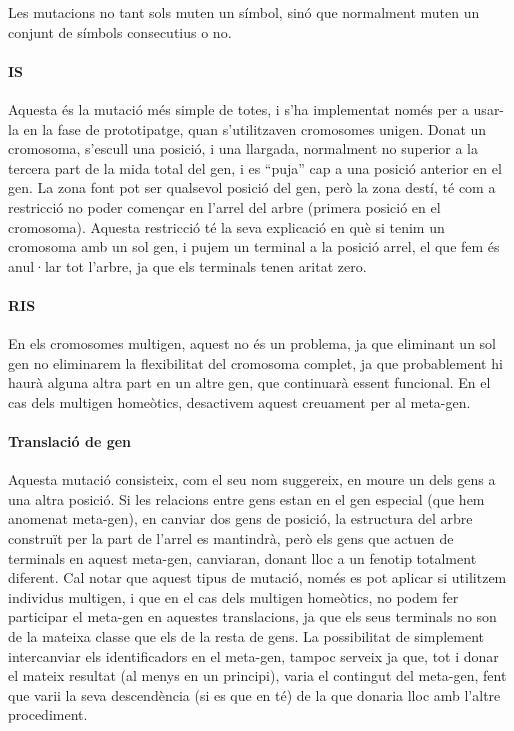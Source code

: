 Les mutacions no tant sols muten un símbol, sinó que normalment muten un
conjunt de símbols consecutius o no.

\paragraph{IS} %
\label{par:IS}
Aquesta és la mutació més simple de totes, i s'ha implementat només per a
usar-la en la fase de prototipatge, quan s'utilitzaven cromosomes unigen.  Donat
un cromosoma, s'escull una posició, i una llargada, normalment no superior a la
tercera part de la mida total del gen, i es ``puja'' cap a una posició anterior
en el gen.  La zona font pot ser qualsevol posició del gen, però la zona destí,
té com a restricció no poder començar en l'arrel del arbre (primera posició en
el cromosoma).  Aquesta restricció té la seva explicació en què si tenim un
cromosoma amb un sol gen, i pujem un terminal a la posició arrel, el que fem és
anul·lar tot l'arbre, ja que els terminals tenen aritat zero.


\paragraph{RIS} %
\label{par:RIS}
En els cromosomes multigen, aquest no és un problema, ja que eliminant un sol
gen no eliminarem la flexibilitat del cromosoma complet, ja que probablement hi
haurà alguna altra part en un altre gen, que continuarà essent funcional.  En el
cas dels multigen homeòtics, desactivem aquest creuament per al meta-gen.

\paragraph{Translació de gen} %
\label{par:Translacio de gen}

Aquesta mutació consisteix, com el seu nom suggereix, en moure un dels gens a una
altra posició.  Si les relacions entre gens estan en el gen especial (que hem
anomenat meta-gen), en canviar dos gens de posició, la estructura del arbre
construït per la part de l'arrel es mantindrà, però els gens que actuen de
terminals en aquest meta-gen, canviaran, donant lloc a un fenotip totalment
diferent.  Cal notar que aquest tipus de mutació, només es pot aplicar si
utilitzem individus multigen, i que en el cas dels multigen homeòtics, no podem
fer participar el meta-gen en aquestes translacions, ja que els seus terminals no
son de la mateixa classe que els de la resta de gens.  La possibilitat de
simplement intercanviar els identificadors en el meta-gen, tampoc serveix ja
que, tot i donar el mateix resultat (al menys en un principi), varia el
contingut del meta-gen, fent que varii la seva descendència (si es que en té) de
la que donaria lloc amb l'altre procediment.

